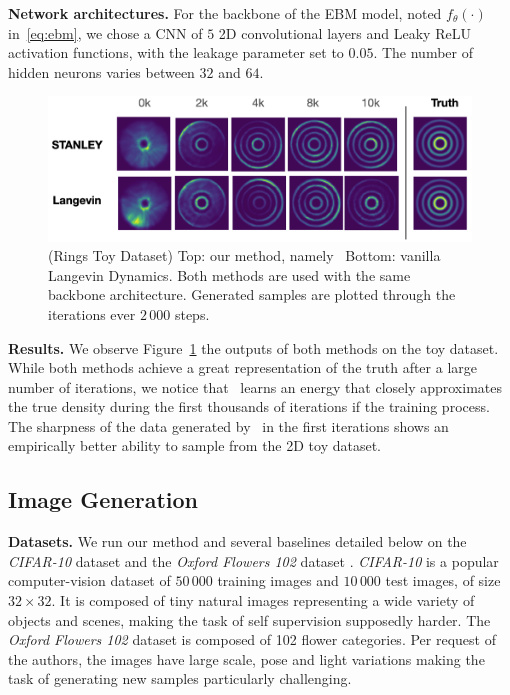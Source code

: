 \documentclass[letterpaper]{article} %
\begin{document}
\medskip
\textbf{Network architectures.} 
For the backbone of the EBM model, noted $f_\theta(\cdot)$ in~\eqref{eq:ebm}, we chose a CNN of $5$ 2D convolutional layers and Leaky ReLU activation functions, with the leakage parameter set to $0.05$.
The number of hidden neurons varies between $32$ and $64$.


\begin{figure}[H]
\hspace{-0.15in}
\includegraphics[width=1.08\linewidth]{figs/rings}
   \caption{(Rings Toy Dataset) Top: our method, namely \algo\ Bottom: vanilla Langevin Dynamics. Both methods are used with the same backbone architecture. Generated samples are plotted through the iterations ever $2\,000$ steps.}
\label{fig:resultstoy}
\end{figure}


\textbf{Results.} 
We observe Figure~\ref{fig:resultstoy} the outputs of both methods on the toy dataset.
While both methods achieve a great representation of the truth after a large number of iterations, we notice that \algo\ learns an energy that closely approximates the true density during the first thousands of iterations if the training process.
The sharpness of the data generated by \algo\ in the first iterations shows an empirically better ability to sample from the 2D toy dataset.

\subsection{Image Generation}

\textbf{Datasets.}
We run our method and several baselines detailed below on the \textit{CIFAR-10} dataset \cite{krizhevsky2009learning} and the \emph{Oxford Flowers 102} dataset \cite{nilsback2008automated}.
\textit{CIFAR-10}  is a popular computer-vision dataset of $50\,000$ training images and $10\,000$ test images, of size $32\times 32$. 
It is composed of tiny natural images representing a wide variety of objects and scenes, making the task of self supervision supposedly harder.
The \emph{Oxford Flowers 102} dataset is composed of 102 flower categories.
Per request of the authors, the images have large scale, pose and light variations making the task of generating new samples particularly challenging.
\end{document}
